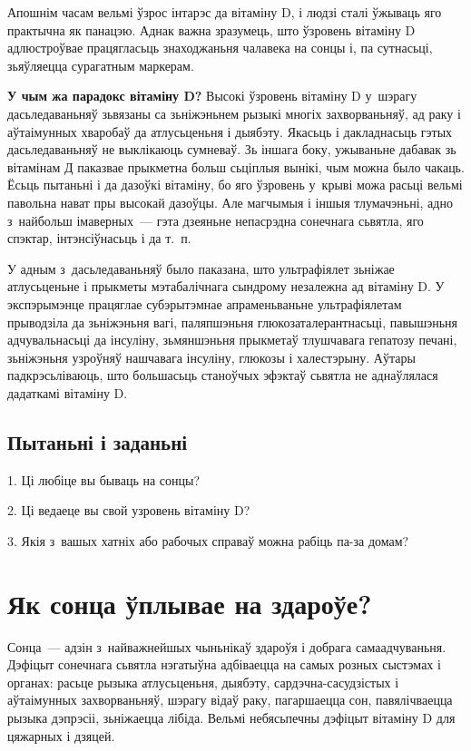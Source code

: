 Апошнім часам вельмі ўзрос інтарэс да вітаміну D, і людзі сталі ўжываць яго практычна як панацэю. Аднак важна зразумець, што ўзровень вітаміну D адлюстроўвае працягласьць знаходжаньня чалавека на сонцы і, па сутнасьці, зьяўляецца сурагатным маркерам.

\textbf{У чым жа парадокс вітаміну D?} Высокі ўзровень вітаміну D у~шэрагу дасьледаваньняў зьвязаны са зьніжэньнем рызыкі многіх захворваньняў, ад раку і аўтаімунных хваробаў да атлусьценьня і дыябэту. Якасьць і дакладнасьць гэтых дасьледаваньняў не выклікаюць сумневаў. Зь іншага боку, ужываньне дабавак зь вітамінам Д паказвае прыкметна больш сьціплыя вынікі, чым можна было чакаць. Ёсьць пытаньні і да дазоўкі вітаміну, бо яго ўзровень у~крыві можа расьці вельмі павольна нават пры высокай дазоўцы. Але магчымыя і іншыя тлумачэньні, адно з~найбольш імаверных~--- гэта дзеяньне непасрэдна сонечнага сьвятла, яго спэктар, інтэнсіўнасьць і да т.~п. 


У адным з~дасьледаваньняў было паказана, што ультрафіялет зьніжае атлусьценьне і прыкметы мэтабалічнага сындрому незалежна ад вітаміну D. У экспэрымэнце працяглае субэрытэмнае апраменьваньне ультрафіялетам прыводзіла да зьніжэньня вагі, паляпшэньня глюкозаталерантнасьці, павышэньня адчувальнасьці да інсуліну, зьмяншэньня прыкметаў тлушчавага гепатозу печані, зьніжэньня узроўняў нашчавага інсуліну, глюкозы і халестэрыну. Аўтары падкрэсьліваюць, што большасьць станоўчых эфэктаў сьвятла не аднаўлялася дадаткамі вітаміну D.

\subsection*{Пытаньні і заданьні}

1. Ці любіце вы бываць на сонцы?

2. Ці ведаеце вы свой узровень вітаміну D?

3. Якія з~вашых хатніх або рабочых справаў можна рабіць па-за домам?


\section{Як сонца ўплывае на здароўе?}

Сонца~--- адзін з~найважнейшых чыньнікаў здароўя і добрага самаадчуваньня. Дэфіцыт сонечнага сьвятла нэгатыўна адбіваецца на самых розных сыстэмах і органах: расьце рызыка атлусьценьня, дыябэту, сардэчна-сасудзістых і аўтаімунных захворваньняў, шэрагу відаў раку, пагаршаецца сон, павялічваецца рызыка дэпрэсіі, зьніжаецца лібіда. Вельмі небясьпечны дэфіцыт вітаміну D для цяжарных і дзяцей.

